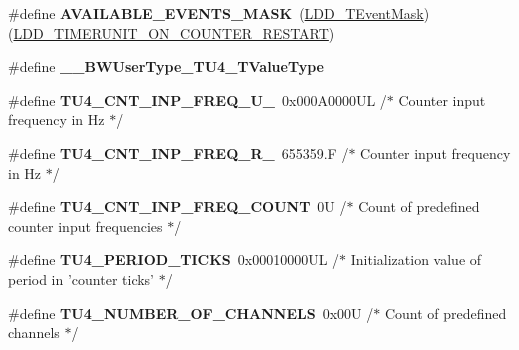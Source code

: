 \begin{DoxyCompactItemize}
\item 
\hypertarget{group___t_u4__module_ga5f04a8830cd52a3ffa1678d113f31aee}{\#define {\bfseries A\-V\-A\-I\-L\-A\-B\-L\-E\-\_\-\-E\-V\-E\-N\-T\-S\-\_\-\-M\-A\-S\-K}~(\hyperlink{group___p_e___types__module_gafbe7f4d4e51560399c3bdd0218584533}{L\-D\-D\-\_\-\-T\-Event\-Mask})(\hyperlink{group___p_e___types__module_gae8e6bf9d76916611a08b76f20ceb1ef7}{L\-D\-D\-\_\-\-T\-I\-M\-E\-R\-U\-N\-I\-T\-\_\-\-O\-N\-\_\-\-C\-O\-U\-N\-T\-E\-R\-\_\-\-R\-E\-S\-T\-A\-R\-T})}\label{group___t_u4__module_ga5f04a8830cd52a3ffa1678d113f31aee}

\item 
\hypertarget{group___t_u4__module_gaed0631ba2fa62f85c6d63dce26df8017}{\#define {\bfseries \-\_\-\-\_\-\-B\-W\-User\-Type\-\_\-\-T\-U4\-\_\-\-T\-Value\-Type}}\label{group___t_u4__module_gaed0631ba2fa62f85c6d63dce26df8017}

\item 
\hypertarget{group___t_u4__module_gaaafe30ecf9c042086d52c2b08af0d6d2}{\#define {\bfseries T\-U4\-\_\-\-C\-N\-T\-\_\-\-I\-N\-P\-\_\-\-F\-R\-E\-Q\-\_\-\-U\-\_}~0x000\-A0000\-U\-L /$\ast$ Counter input frequency in Hz $\ast$/}\label{group___t_u4__module_gaaafe30ecf9c042086d52c2b08af0d6d2}

\item 
\hypertarget{group___t_u4__module_ga300216213fd74290f4265314bd46f08a}{\#define {\bfseries T\-U4\-\_\-\-C\-N\-T\-\_\-\-I\-N\-P\-\_\-\-F\-R\-E\-Q\-\_\-\-R\-\_}~655359.\-F /$\ast$ Counter input frequency in Hz $\ast$/}\label{group___t_u4__module_ga300216213fd74290f4265314bd46f08a}

\item 
\hypertarget{group___t_u4__module_gad0fa3c67514755355f00e78c03d87d9b}{\#define {\bfseries T\-U4\-\_\-\-C\-N\-T\-\_\-\-I\-N\-P\-\_\-\-F\-R\-E\-Q\-\_\-\-C\-O\-U\-N\-T}~0\-U      /$\ast$ Count of predefined counter input frequencies $\ast$/}\label{group___t_u4__module_gad0fa3c67514755355f00e78c03d87d9b}

\item 
\hypertarget{group___t_u4__module_gac1d3704a870955cebd5c68120400dae4}{\#define {\bfseries T\-U4\-\_\-\-P\-E\-R\-I\-O\-D\-\_\-\-T\-I\-C\-K\-S}~0x00010000\-U\-L /$\ast$ Initialization value of period in 'counter ticks' $\ast$/}\label{group___t_u4__module_gac1d3704a870955cebd5c68120400dae4}

\item 
\hypertarget{group___t_u4__module_ga0c7139d87830a0f3c6be6eea989550b3}{\#define {\bfseries T\-U4\-\_\-\-N\-U\-M\-B\-E\-R\-\_\-\-O\-F\-\_\-\-C\-H\-A\-N\-N\-E\-L\-S}~0x00\-U   /$\ast$ Count of predefined channels $\ast$/}\label{group___t_u4__module_ga0c7139d87830a0f3c6be6eea989550b3}


\end{DoxyCompactItemize}
